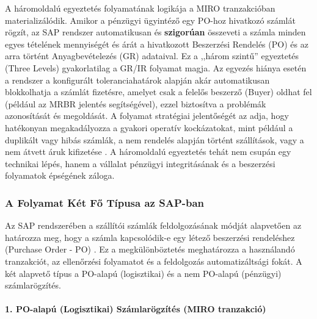 A háromoldalú egyeztetés folyamatának logikája a MIRO tranzakcióban materializálódik. Amikor a pénzügyi ügyintéző egy PO-hoz hivatkozó számlát rögzít, az SAP rendszer automatikusan és \textbf{szigorúan} összeveti a számla minden egyes tételének mennyiségét és árát a hivatkozott Beszerzési Rendelés (PO) és az arra történt Anyagbevételezés (GR) adataival.
Ez a ,,három szintű'' egyeztetés (Three Levels) gyakorlatilag a GR/IR folyamat magja.
Az egyezés hiánya esetén a rendszer a konfigurált toleranciahatárok alapján akár automatikusan blokkolhatja a számlát fizetésre, amelyet csak a felelős beszerző (Buyer) oldhat fel (például az MRBR jelentés segítségével), ezzel biztosítva a problémák azonosítását és megoldását.
A folyamat stratégiai jelentőségét az adja, hogy hatékonyan megakadályozza a gyakori operatív kockázatokat, mint például a duplikált vagy hibás számlák, a nem rendelés alapján történt szállítások, vagy a nem átvett áruk kifizetése \cite{SAP-LIV}.
A háromoldalú egyeztetés tehát nem csupán egy technikai lépés, hanem a vállalat pénzügyi integritásának és a beszerzési folyamatok épségének záloga.

\subsubsection{A Folyamat Két Fő Típusa az SAP-ban}

Az SAP rendszerében a szállítói számlák feldolgozásának módját alapvetően az határozza meg, hogy a számla kapcsolódik-e egy létező beszerzési rendeléshez (Purchase Order - PO) \cite{SAP-Managing-Invoices, SAP-Non-PO-Invoices}.
Ez a megkülönböztetés meghatározza a használandó tranzakciót, az ellenőrzési folyamatot és a feldolgozás automatizáltsági fokát.
A két alapvető típus a PO-alapú (logisztikai) és a nem PO-alapú (pénzügyi) számlarögzítés.

\paragraph{1. PO-alapú (Logisztikai) Számlarögzítés (MIRO tranzakció) \cite{SAP-Managing-Invoices}}

